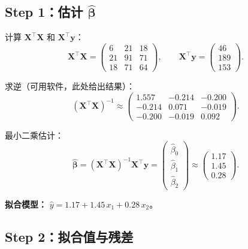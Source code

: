 \subsection{Step 1：估计 $\hat{\bm{\beta}}$}

计算 $\mathbf{X}^\top \mathbf{X}$ 和 $\mathbf{X}^\top \mathbf{y}$：
\[
    \mathbf{X}^\top \mathbf{X}
    = \begin{pmatrix}
        6      & 21     & 18 \\
        21     & 91     & 71 \\
        18     & 71     & 64
    \end{pmatrix},
    \qquad
    \mathbf{X}^\top \mathbf{y}
    = \begin{pmatrix} 46 \\ 189 \\ 153 \end{pmatrix}.
\]

求逆（可用软件，此处给出结果）：
\[
    (\mathbf{X}^\top \mathbf{X})^{-1}
    \approx \begin{pmatrix}
        1.557 & -0.214 & -0.200 \\
        -0.214 &  0.071 & -0.019 \\
        -0.200 & -0.019 &  0.092
    \end{pmatrix}.
\]

最小二乘估计：
\[
    \hat{\bm{\beta}} = (\mathbf{X}^\top \mathbf{X})^{-1} \mathbf{X}^\top \mathbf{y}
    = \begin{pmatrix}
        \hat{\beta}_0 \\ \hat{\beta}_1 \\ \hat{\beta}_2
    \end{pmatrix}
    \approx \begin{pmatrix}
        1.17 \\ 1.45 \\ 0.28
    \end{pmatrix}.
\]

\textbf{拟合模型：} $\hat{y} = 1.17 + 1.45\, x_1 + 0.28\, x_2$。

\subsection{Step 2：拟合值与残差}

